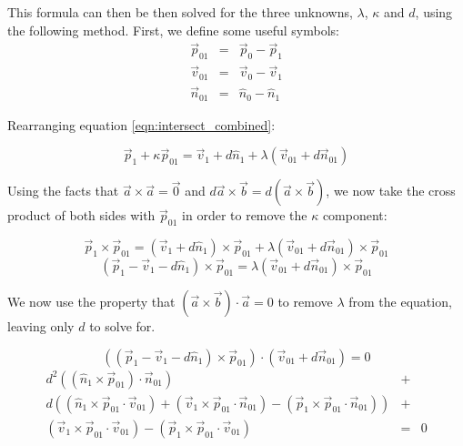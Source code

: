 This formula can then be then solved for the three unknowns, $\lambda$, $\kappa$ and $d$, using the following method. First, we define some useful symbols:
\begin{eqnarray}
\vec{p}_{01} & = & \vec{p}_0 - \vec{p}_1 \nonumber \\
\vec{v}_{01} & = & \vec{v}_0 - \vec{v}_1 \nonumber \\
\vec{n}_{01} & = & \hat{n}_0 - \hat{n}_1 \nonumber
\end{eqnarray}

Rearranging equation \ref{eqn:intersect_combined}:

\begin{equation} \label{eqn:intsolv0}
\vec{p}_1 + \kappa\vec{p}_{01} = \vec{v}_1 + d\hat{n}_1 + \lambda(\vec{v}_{01}+d\vec{n}_{01})
\end{equation}

Using the facts that $\vec{a} \times \vec{a} = \vec{0}$ and $d\vec{a} \times \vec{b} = d(\vec{a} \times \vec{b})$, we now take the cross product of both sides with $\vec{p}_{01}$ in order to remove the $\kappa$ component:

\begin{equation}
\vec{p}_1 \times \vec{p}_{01} = (\vec{v}_1 + d\hat{n}_1) \times \vec{p}_{01} + \lambda(\vec{v}_{01}+d\vec{n}_{01}) \times \vec{p}_{01}
\end{equation}
\begin{equation} \label{eqn:intsolv1}
(\vec{p}_1 - \vec{v}_1 - d\hat{n}_1) \times \vec{p}_{01} = \lambda(\vec{v}_{01}+d\vec{n}_{01}) \times \vec{p}_{01}
\end{equation}

We now use the property that $(\vec{a} \times \vec{b}) \cdot \vec{a}  = 0$ to remove $\lambda$ from the equation, leaving only $d$ to solve for.

\begin{equation}
((\vec{p}_1 - \vec{v}_1 - d\hat{n}_1) \times \vec{p}_{01}) \cdot (\vec{v}_{01}+d\vec{n}_{01}) = 0
\end{equation}
\begin{eqnarray} \label{eqn:intsolv2} 
d^2((\hat{n}_1 \times \vec{p}_{01}) \cdot \vec{n}_{01})  & + & \nonumber \\
d((\hat{n}_1 \times \vec{p}_{01} \cdot \vec{v}_{01}) + (\vec{v}_1 \times \vec{p}_{01} \cdot \vec{n}_{01}) - (\vec{p}_1 \times \vec{p}_{01} \cdot \vec{n}_{01})) & + & \nonumber \\
(\vec{v}_1 \times \vec{p}_{01} \cdot \vec{v}_{01}) - (\vec{p}_1 \times \vec{p}_{01} \cdot \vec{v}_{01}) & = & 0
\end{eqnarray}

